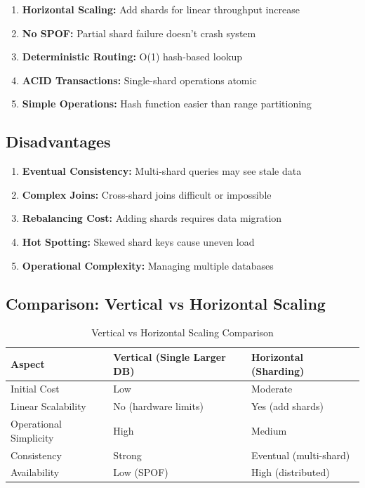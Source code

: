 \documentclass[12pt,a4paper]{article}
\begin{document}
\begin{enumerate}
    \item \textbf{Horizontal Scaling:} Add shards for linear throughput increase
    \item \textbf{No SPOF:} Partial shard failure doesn't crash system
    \item \textbf{Deterministic Routing:} O(1) hash-based lookup
    \item \textbf{ACID Transactions:} Single-shard operations atomic
    \item \textbf{Simple Operations:} Hash function easier than range partitioning
\end{enumerate}

\subsection{Disadvantages}

\begin{enumerate}
    \item \textbf{Eventual Consistency:} Multi-shard queries may see stale data
    \item \textbf{Complex Joins:} Cross-shard joins difficult or impossible
    \item \textbf{Rebalancing Cost:} Adding shards requires data migration
    \item \textbf{Hot Spotting:} Skewed shard keys cause uneven load
    \item \textbf{Operational Complexity:} Managing multiple databases
\end{enumerate}

\subsection{Comparison: Vertical vs Horizontal Scaling}

\begin{table}[H]
\centering
\begin{tabularx}{\textwidth}{|l|X|X|}
\hline
\textbf{Aspect} & \textbf{Vertical (Single Larger DB)} & \textbf{Horizontal (Sharding)} \\
\hline
Initial Cost & Low & Moderate \\
Linear Scalability & No (hardware limits) & Yes (add shards) \\
Operational Simplicity & High & Medium \\
Consistency & Strong & Eventual (multi-shard) \\
Availability & Low (SPOF) & High (distributed) \\
\hline
\end{tabularx}
\caption{Vertical vs Horizontal Scaling Comparison}
\end{table}
\end{document}
